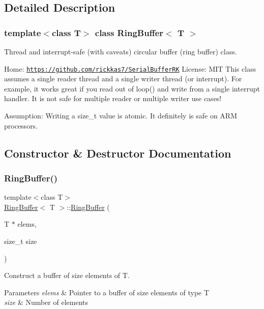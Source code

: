 \subsection{Detailed Description}
\subsubsection*{template$<$class T$>$\newline
class Ring\+Buffer$<$ T $>$}

Thread and interrupt-\/safe (with caveats) circular buffer (ring buffer) class. 

Home\+: \href{https://github.com/rickkas7/SerialBufferRK}{\tt https\+://github.\+com/rickkas7/\+Serial\+Buffer\+RK} License\+: M\+IT This class assumes a single reader thread and a single writer thread (or interrupt). For example, it works great if you read out of loop() and write from a single interrupt handler. It is not safe for multiple reader or multiple writer use cases!

Assumption\+: Writing a size\+\_\+t value is atomic. It definitely is safe on A\+RM processors. 

\subsection{Constructor \& Destructor Documentation}
\mbox{\label{class_ring_buffer_a234232078f579680a091bc504b5eee5e}} 
\subsubsection{\texorpdfstring{Ring\+Buffer()}{RingBuffer()}}
{\footnotesize\ttfamily template$<$class T$>$ \\
\mbox{\hyperlink{class_ring_buffer}{Ring\+Buffer}}$<$ T $>$\+::\mbox{\hyperlink{class_ring_buffer}{Ring\+Buffer}} (\begin{DoxyParamCaption}\item[{T $\ast$}]{elems,  }\item[{size\+\_\+t}]{size }\end{DoxyParamCaption})\hspace{0.3cm}{\ttfamily [inline]}}



Construct a buffer of size elements of T. 


\begin{DoxyParams}{Parameters}
{\em elems} & Pointer to a buffer of size elements of type T\\
\hline
{\em size} & Number of elements \\
\hline
\end{DoxyParams}


